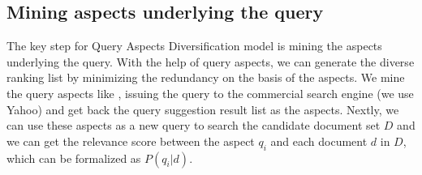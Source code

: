 \documentclass[review]{elsarticle}
\begin{document}
%
%
%
\subsection{Mining aspects underlying the query}\label{mine_aspect}
The key step for Query Aspects Diversification model is mining the aspects underlying the query. With the help of query aspects, we can generate the diverse ranking list by minimizing the redundancy on the basis of the aspects. We mine the query aspects like \cite{santos2010exploiting}, issuing the query to the commercial search engine (we use Yahoo) and get back the query suggestion result list as the aspects. Nextly, we can use these aspects as a new query to search the candidate document set $D$ and we can get the relevance score between the aspect $q_i$ and each document $d$ in $D$, which can be formalized as $P(q_i|d)$.
\end{document}
